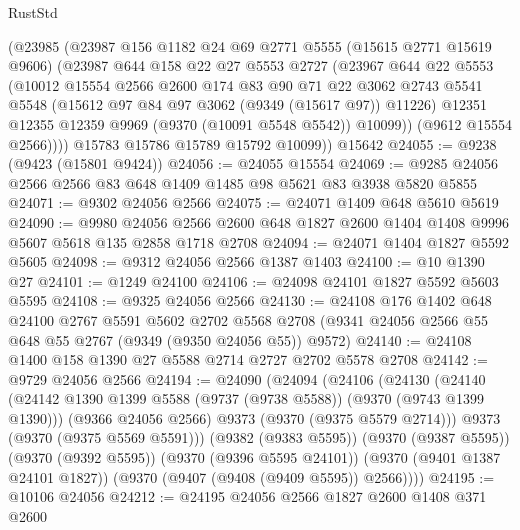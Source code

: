 \begin{lexlean}{RustStd}
\begin{coremodule}
{\begin{coremodule}
{{{{{{{{{{{{{{{{{{{{{{{{{{{{{{{{{{{{{{{        (@23985
          (@23987
            @156
            @1182
            @24
            @69
            @2771
            @5555
            (@15615 @2771 @15619 @9606)
            (@23987
              @644
              @158
              @22
              @27
              @5553
              @2727
              (@23967
                @644
                @22
                @5553
                (@10012
                  @15554
                  @2566
                  @2600
                  @174
                  @83
                  @90
                  @71
                  @22
                  @3062
                  @2743
                  @5541
                  @5548
                  (@15612 @97 @84 @97 @3062 (@9349 (@15617 @97)) @11226)
                  @12351
                  @12355
                  @12359
                  @9969
                  (@9370 (@10091 @5548 @5542))
                  @10099))
              (@9612 @15554 @2566))))
        @15783
        @15786
        @15789
        @15792
        @10099))
    @15642
@24055 := @9238 (@9423 (@15801 @9424))
@24056 := @24055 @15554
@24069 := @9285 @24056 @2566 @2566 @83 @648 @1409 @1485 @98 @5621 @83 @3938 @5820 @5855
@24071 := @9302 @24056 @2566
@24075 := @24071 @1409 @648 @5610 @5619
@24090 := @9980
    @24056
    @2566
    @2600
    @648
    @1827
    @2600
    @1404
    @1408
    @9996
    @5607
    @5618
    @135
    @2858
    @1718
    @2708
@24094 := @24071 @1404 @1827 @5592 @5605
@24098 := @9312 @24056 @2566 @1387 @1403
@24100 := @10 @1390 @27
@24101 := @1249 @24100
@24106 := @24098 @24101 @1827 @5592 @5603 @5595
@24108 := @9325 @24056 @2566
@24130 := @24108
    @176
    @1402
    @648
    @24100
    @2767
    @5591
    @5602
    @2702
    @5568
    @2708
    (@9341 @24056 @2566 @55 @648 @55 @2767 (@9349 (@9350 @24056 @55)) @9572)
@24140 := @24108 @1400 @158 @1390 @27 @5588 @2714 @2727 @2702 @5578 @2708
@24142 := @9729 @24056 @2566
@24194 := @24090
    (@24094
      (@24106
        (@24130
          (@24140
            (@24142 @1390 @1399 @5588 (@9737 (@9738 @5588)) (@9370 (@9743 @1399 @1390)))
            (@9366 @24056 @2566)
            @9373
            (@9370 (@9375 @5579 @2714)))
          @9373
          (@9370 (@9375 @5569 @5591)))
        (@9382 (@9383 @5595))
        (@9370 (@9387 @5595))
        (@9370 (@9392 @5595))
        (@9370 (@9396 @5595 @24101))
        (@9370 (@9401 @1387 @24101 @1827))
        (@9370 (@9407 (@9408 (@9409 @5595)) @2566))))
@24195 := @10106 @24056
@24212 := @24195
    @24056
    @2566
    @1827
    @2600
    @1408
    @371
    @2600
}}}}}}}}}}}}}}}}}}}}}}}}}}}}}}}}}}}}}}}
\end{coremodule}}
\end{coremodule}
\end{lexlean}
